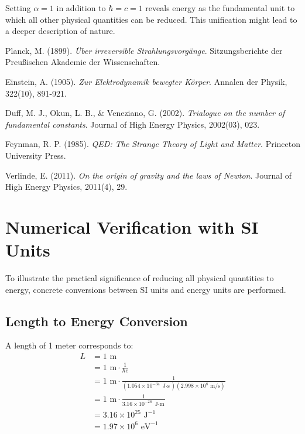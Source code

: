 \documentclass{article}
\begin{document}
	Setting $\alpha = 1$ in addition to $\hbar = c = 1$ reveals energy as the fundamental unit to which all other physical quantities can be reduced. This unification might lead to a deeper description of nature.
	
	\begin{thebibliography}{5}
		Planck, M. (1899).
		\textit{Über irreversible Strahlungsvorgänge}.
		Sitzungsberichte der Preußischen Akademie der Wissenschaften.
		
		Einstein, A. (1905).
		\textit{Zur Elektrodynamik bewegter Körper}.
		Annalen der Physik, 322(10), 891-921.
		
		Duff, M. J., Okun, L. B., \& Veneziano, G. (2002).
		\textit{Trialogue on the number of fundamental constants}.
		Journal of High Energy Physics, 2002(03), 023.
		
		Feynman, R. P. (1985).
		\textit{QED: The Strange Theory of Light and Matter}.
		Princeton University Press.
		
		Verlinde, E. (2011).
		\textit{On the origin of gravity and the laws of Newton}.
		Journal of High Energy Physics, 2011(4), 29.
	\end{thebibliography}
	
	\appendix
	\section{Numerical Verification with SI Units}
	
	To illustrate the practical significance of reducing all physical quantities to energy, concrete conversions between SI units and energy units are performed.
	
	\subsection{Length to Energy Conversion}
	
	A length of 1 meter corresponds to:
	\begin{align}
		L &= 1 \text{ m} \\
		&= 1 \text{ m} \cdot \frac{1}{\hbar c} \\
		&= 1 \text{ m} \cdot \frac{1}{(1.054 \times 10^{-34} \text{ J$\cdot$s})(2.998 \times 10^8 \text{ m/s})} \\
		&= 1 \text{ m} \cdot \frac{1}{3.16 \times 10^{-26} \text{ J$\cdot$m}} \\
		&= 3.16 \times 10^{25} \text{ J}^{-1} \\
		&= 1.97 \times 10^{6} \text{ eV}^{-1}
	\end{align}
	
\end{document}
